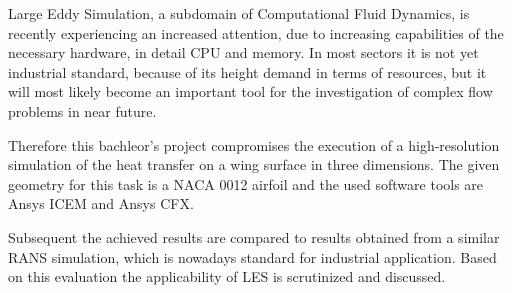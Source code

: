 Large Eddy Simulation, a subdomain of Computational Fluid Dynamics, is recently experiencing an increased attention, due to increasing capabilities of the necessary hardware, in detail CPU and memory. In most sectors it is not yet industrial standard, because of its height demand in terms of resources, but it will most likely become an important tool for the investigation of complex flow problems in near future. 

Therefore this bachleor's project compromises the execution of a high-resolution simulation of the heat transfer on a wing surface in three dimensions. The given geometry for this task is a NACA 0012 airfoil and the used software tools are Ansys ICEM and Ansys CFX. 

Subsequent the achieved results are compared to results obtained from a similar RANS simulation, which is nowadays standard for industrial application. Based on this evaluation the applicability of LES is scrutinized and discussed.